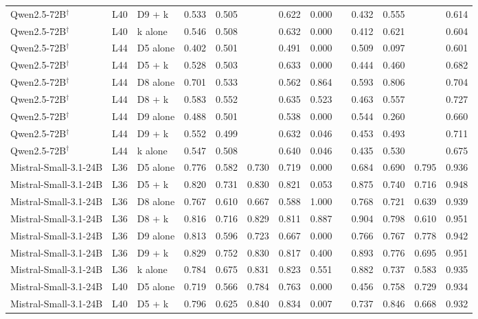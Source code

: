 \begin{table}
\begin{tabular}{lllrrrrrrrrrr}
Qwen2.5-72B$^\dagger$ & L40 & D9 + k & 0.533 & 0.505 &  & 0.622 & 0.000 &  & 0.432 & 0.555 &  & 0.614 \\
Qwen2.5-72B$^\dagger$ & L40 & k alone & 0.546 & 0.508 &  & 0.632 & 0.000 &  & 0.412 & 0.621 &  & 0.604 \\
Qwen2.5-72B$^\dagger$ & L44 & D5 alone & 0.402 & 0.501 &  & 0.491 & 0.000 &  & 0.509 & 0.097 &  & 0.601 \\
Qwen2.5-72B$^\dagger$ & L44 & D5 + k & 0.528 & 0.503 &  & 0.633 & 0.000 &  & 0.444 & 0.460 &  & 0.682 \\
Qwen2.5-72B$^\dagger$ & L44 & D8 alone & 0.701 & 0.533 &  & 0.562 & 0.864 &  & 0.593 & 0.806 &  & 0.704 \\
Qwen2.5-72B$^\dagger$ & L44 & D8 + k & 0.583 & 0.552 &  & 0.635 & 0.523 &  & 0.463 & 0.557 &  & 0.727 \\
Qwen2.5-72B$^\dagger$ & L44 & D9 alone & 0.488 & 0.501 &  & 0.538 & 0.000 &  & 0.544 & 0.260 &  & 0.660 \\
Qwen2.5-72B$^\dagger$ & L44 & D9 + k & 0.552 & 0.499 &  & 0.632 & 0.046 &  & 0.453 & 0.493 &  & 0.711 \\
Qwen2.5-72B$^\dagger$ & L44 & k alone & 0.547 & 0.508 &  & 0.640 & 0.046 &  & 0.435 & 0.530 &  & 0.675 \\
Mistral-Small-3.1-24B & L36 & D5 alone & 0.776 & 0.582 & 0.730 & 0.719 & 0.000 &  & 0.684 & 0.690 & 0.795 & 0.936 \\
Mistral-Small-3.1-24B & L36 & D5 + k & 0.820 & 0.731 & 0.830 & 0.821 & 0.053 &  & 0.875 & 0.740 & 0.716 & 0.948 \\
Mistral-Small-3.1-24B & L36 & D8 alone & 0.767 & 0.610 & 0.667 & 0.588 & 1.000 &  & 0.768 & 0.721 & 0.639 & 0.939 \\
Mistral-Small-3.1-24B & L36 & D8 + k & 0.816 & 0.716 & 0.829 & 0.811 & 0.887 &  & 0.904 & 0.798 & 0.610 & 0.951 \\
Mistral-Small-3.1-24B & L36 & D9 alone & 0.813 & 0.596 & 0.723 & 0.667 & 0.000 &  & 0.766 & 0.767 & 0.778 & 0.942 \\
Mistral-Small-3.1-24B & L36 & D9 + k & 0.829 & 0.752 & 0.830 & 0.817 & 0.400 &  & 0.893 & 0.776 & 0.695 & 0.951 \\
Mistral-Small-3.1-24B & L36 & k alone & 0.784 & 0.675 & 0.831 & 0.823 & 0.551 &  & 0.882 & 0.737 & 0.583 & 0.935 \\
Mistral-Small-3.1-24B & L40 & D5 alone & 0.719 & 0.566 & 0.784 & 0.763 & 0.000 &  & 0.456 & 0.758 & 0.729 & 0.934 \\
Mistral-Small-3.1-24B & L40 & D5 + k & 0.796 & 0.625 & 0.840 & 0.834 & 0.007 &  & 0.737 & 0.846 & 0.668 & 0.932 \\

\end{tabular}
\end{table}
